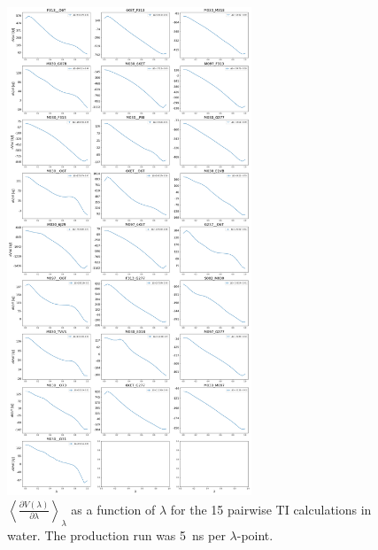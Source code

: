 \begin{figure}[H]
    \centering
    \includegraphics[width=0.65\textwidth]{fig/SI/dG_convergence/TI_water_lambda_curves.png}
    \caption{$\left< \frac{\partial V(\lambda)}{\partial \lambda} \right>_{\lambda}$ as a function of $\lambda$ for the 15 pairwise TI calculations in water. The production run was 5~ns per $\lambda$-point.}
    \label{SIfig:TI_water_curve}
\end{figure}

